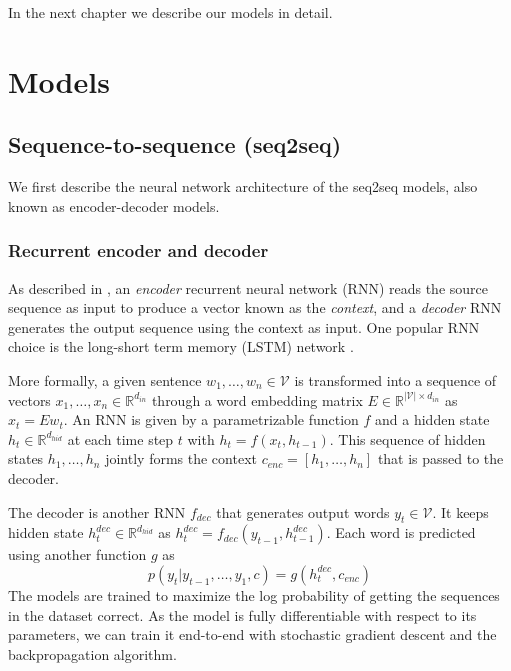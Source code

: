 \documentclass[11pt]{report}
\begin{document}
In the next chapter we describe our models in detail.



\chapter{Models}

\section{Sequence-to-sequence (seq2seq)}

We first describe the neural network architecture of the seq2seq models, also known as encoder-decoder models.

\subsection{Recurrent encoder and decoder}

As described in \cite{bahdanau2014neural}, an \emph{encoder} recurrent neural network (RNN) reads the source sequence as input to produce a vector known as the \emph{context}, and a \emph{decoder} RNN generates the output sequence using the context as input.  One popular RNN choice is the long-short term memory (LSTM) network \citep{hochreiter1997long}.

More formally, a given sentence $w_1, \ldots, w_n \in \mathcal{V}$ is transformed into a sequence of vectors $x_1, \ldots, x_n \in \mathbb{R}^{d_{in}}$ through a word embedding matrix $E \in \mathbb{R}^{|\mathcal{V}| \times d_{in}}$ as $x_t = Ew_t$. An RNN is given by a parametrizable function $f$ and a hidden state $h_t \in \mathbb{R}^{ d_{hid}}$ at each time step $t$ with $h_t = f(x_t, h_{t-1})$. This sequence of hidden states $h_1, \ldots, h_n$ jointly forms the context $c_{enc} = [h_1, \ldots, h_n]$ that is passed to the decoder.


The decoder is another RNN $f_{dec}$ that generates output words $y_t \in \mathcal{V}$. It keeps hidden state $h_t^{dec} \in \mathbb{R}^{d_{hid}}$ as $h_t^{dec} = f_{dec}(y_{t-1}, h_{t-1}^{dec})$. Each word is predicted using another function $g$ as
$$p(y_t | y_{t-1}, \ldots, y_1, c) = g(h_t^{dec}, c_{enc})$$
The models are trained to maximize the log probability of getting the sequences in the dataset correct. As the model is fully differentiable with respect to its parameters, we can train it end-to-end with stochastic gradient descent and the backpropagation algorithm.
\end{document}
